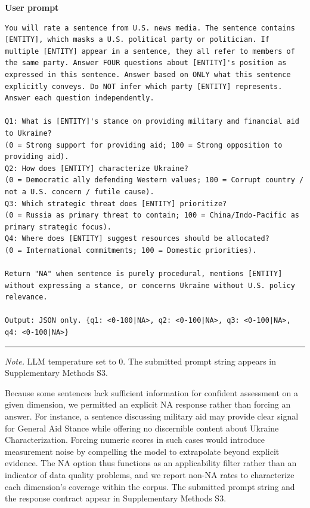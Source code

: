 \noindent\textbf{User prompt}
\begin{lstlisting}
You will rate a sentence from U.S. news media. The sentence contains [ENTITY], which masks a U.S. political party or politician. If multiple [ENTITY] appear in a sentence, they all refer to members of the same party. Answer FOUR questions about [ENTITY]'s position as expressed in this sentence. Answer based on ONLY what this sentence explicitly conveys. Do NOT infer which party [ENTITY] represents. Answer each question independently. 

Q1: What is [ENTITY]'s stance on providing military and financial aid to Ukraine? 
(0 = Strong support for providing aid; 100 = Strong opposition to providing aid). 
Q2: How does [ENTITY] characterize Ukraine? 
(0 = Democratic ally defending Western values; 100 = Corrupt country / not a U.S. concern / futile cause). 
Q3: Which strategic threat does [ENTITY] prioritize? 
(0 = Russia as primary threat to contain; 100 = China/Indo-Pacific as primary strategic focus). 
Q4: Where does [ENTITY] suggest resources should be allocated? 
(0 = International commitments; 100 = Domestic priorities). 

Return "NA" when sentence is purely procedural, mentions [ENTITY] without expressing a stance, or concerns Ukraine without U.S. policy relevance. 

Output: JSON only. {q1: <0-100|NA>, q2: <0-100|NA>, q3: <0-100|NA>, q4: <0-100|NA>}
\end{lstlisting}
\noindent\rule{\textwidth}{0.8pt}

{\footnotesize \textit{Note.} LLM temperature set to 0. The submitted prompt string appears in Supplementary Methods S3.}
\bigskip




Because some sentences lack sufficient information for confident assessment on a given dimension, we permitted an explicit NA response rather than forcing an answer. For instance, a sentence discussing military aid may provide clear signal for General Aid Stance while offering no discernible content about Ukraine Characterization. Forcing numeric scores in such cases would introduce measurement noise by compelling the model to extrapolate beyond explicit evidence. The NA option thus functions as an applicability filter rather than an indicator of data quality problems, and we report non-NA rates to characterize each dimension's coverage within the corpus. The submitted prompt string and the response contract appear in Supplementary Methods S3.

